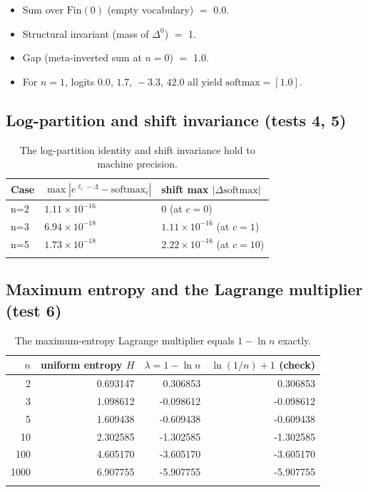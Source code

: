 \documentclass[11pt]{article}
\newcommand{\simplex}[1]{\Delta^{#1}}
\newcommand{\softmax}{\mathrm{softmax}}
\begin{document}
\begin{itemize}
\item Sum over $\mathrm{Fin}(0)$ (empty vocabulary) $=$ 0.0.
\item Structural invariant (mass of $\simplex{0}$) $=$ 1.
\item Gap (meta-inverted sum at $n=0$) $=$ 1.0.
\item For $n=1$, logits $0.0,\,1.7,\,-3.3,\,42.0$ all yield
$\softmax = [1.0]$.
\end{itemize}

\subsection{Log-partition and shift invariance (tests 4, 5)}
\label{sec:ev-logpart}

\begin{longtable}{@{}lll@{}}
\toprule
Case & $\max|e^{\ell_i-\Lambda} - \softmax_i|$ & shift max $|\Delta\softmax|$ \\
\midrule
n=2 & $1.11\times 10^{-16}$ & $0$ (at $c=0$) \\
n=3 & $6.94\times 10^{-18}$ & $1.11\times 10^{-16}$ (at $c=1$) \\
n=5 & $1.73\times 10^{-18}$ & $2.22\times 10^{-16}$ (at $c=10$) \\
\bottomrule
\caption{The log-partition identity and shift invariance hold to machine
precision.}
\label{tab:ev-logpart}
\end{longtable}

\subsection{Maximum entropy and the Lagrange multiplier (test 6)}
\label{sec:ev-maxent}

\begin{longtable}{@{}rrrr@{}}
\toprule
$n$ & uniform entropy $H$ & $\lambda = 1-\ln n$ & $\ln(1/n)+1$ (check) \\
\midrule
2 & 0.693147 & 0.306853 & 0.306853 \\
3 & 1.098612 & -0.098612 & -0.098612 \\
5 & 1.609438 & -0.609438 & -0.609438 \\
10 & 2.302585 & -1.302585 & -1.302585 \\
100 & 4.605170 & -3.605170 & -3.605170 \\
1000 & 6.907755 & -5.907755 & -5.907755 \\
\bottomrule
\caption{The maximum-entropy Lagrange multiplier equals $1-\ln n$ exactly.}
\label{tab:ev-maxent}
\end{longtable}
\end{document}
